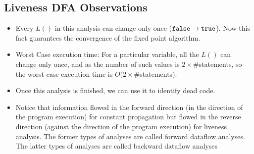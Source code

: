\subsection{Liveness DFA Observations}
\begin{itemize}
    \item Every $L()$ in this analysis can change only once (${\tt false} \rightarrow {\tt true}$). Now this fact guarantees the convergence of the fixed point algorithm.
    \item Worst Case execution time: For a particular variable, all the $L()$ can change only once, and as the number of such values is $2 \times \#$statements, so the worst case execution time is $O(2 \times \#$statements).
    \item Once this analysis is finished, we can use it to identify dead code.
    \item Notice that information flowed in the forward direction (in the direction of the program execution) for constant propagation but flowed in the reverse direction (against the direction of the program execution) for liveness analysis.
    The former types of analyses are called forward dataflow analyses. The latter types of analyses are called backward dataflow analyses
\end{itemize}